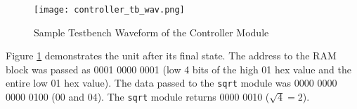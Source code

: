 \documentclass[paper=usletter, fontsize=12pt]{article}
\begin{document}
    \begin{figure}[ht]
        \begin{center}
            \texttt{[image: controller\_tb\_wav.png]}
            \caption{Sample Testbench Waveform of the Controller Module}
            \label{fig:tbwav}
        \end{center}
    \end{figure}

    Figure \ref{fig:tbwav} demonstrates the unit after its final state. The
    address to the RAM block was passed as 0001 0000 0001 (low 4 bits of the
    high 01 hex value and the entire low 01 hex value). The data passed to the
    \texttt{sqrt} module was 0000 0000 0000 0100 (00 and 04). The \texttt{sqrt}
    module returns 0000 0010 ($\sqrt{\text{4}}=\text{2}$).
\end{document}
